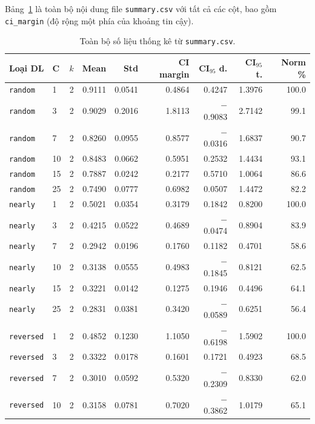 \documentclass[12pt, a4paper]{article}
\begin{document}
Bảng~\ref{tab:full} là toàn bộ nội dung file \texttt{summary.csv} với tất cả các
cột, bao gồm \texttt{ci\_margin} (độ rộng một phía của khoảng tin cậy).

\begin{table}[H]
\centering
\caption{Toàn bộ số liệu thống kê từ \texttt{summary.csv}.}
\label{tab:full}
\scriptsize
\renewcommand{\arraystretch}{1.2}
\begin{tabular}{llrrrrrrr}
\toprule
\textbf{Loại DL} & \textbf{C} & \textbf{$k$} & \textbf{Mean} & \textbf{Std}
                 & \textbf{CI margin} & \textbf{CI$_{95}$ d.} & \textbf{CI$_{95}$ t.} & \textbf{Norm \%} \\
\midrule
\texttt{random}   & 1  & 2 & 0.9111 & 0.0541 & 0.4864 &  0.4247 & 1.3976 & 100.0 \\
\texttt{random}   & 3  & 2 & 0.9029 & 0.2016 & 1.8113 & $-$0.9083 & 2.7142 & 99.1 \\
\texttt{random}   & 7  & 2 & 0.8260 & 0.0955 & 0.8577 & $-$0.0316 & 1.6837 & 90.7 \\
\texttt{random}   & 10 & 2 & 0.8483 & 0.0662 & 0.5951 &  0.2532 & 1.4434 & 93.1 \\
\texttt{random}   & 15 & 2 & 0.7887 & 0.0242 & 0.2177 &  0.5710 & 1.0064 & 86.6 \\
\texttt{random}   & 25 & 2 & 0.7490 & 0.0777 & 0.6982 &  0.0507 & 1.4472 & 82.2 \\
\midrule
\texttt{nearly}   & 1  & 2 & 0.5021 & 0.0354 & 0.3179 &  0.1842 & 0.8200 & 100.0 \\
\texttt{nearly}   & 3  & 2 & 0.4215 & 0.0522 & 0.4689 & $-$0.0474 & 0.8904 & 83.9 \\
\texttt{nearly}   & 7  & 2 & 0.2942 & 0.0196 & 0.1760 &  0.1182 & 0.4701 & 58.6 \\
\texttt{nearly}   & 10 & 2 & 0.3138 & 0.0555 & 0.4983 & $-$0.1845 & 0.8121 & 62.5 \\
\texttt{nearly}   & 15 & 2 & 0.3221 & 0.0142 & 0.1275 &  0.1946 & 0.4496 & 64.1 \\
\texttt{nearly}   & 25 & 2 & 0.2831 & 0.0381 & 0.3420 & $-$0.0589 & 0.6251 & 56.4 \\
\midrule
\texttt{reversed} & 1  & 2 & 0.4852 & 0.1230 & 1.1050 & $-$0.6198 & 1.5902 & 100.0 \\
\texttt{reversed} & 3  & 2 & 0.3322 & 0.0178 & 0.1601 &  0.1721 & 0.4923 & 68.5 \\
\texttt{reversed} & 7  & 2 & 0.3010 & 0.0592 & 0.5320 & $-$0.2309 & 0.8330 & 62.0 \\
\texttt{reversed} & 10 & 2 & 0.3158 & 0.0781 & 0.7020 & $-$0.3862 & 1.0179 & 65.1 \\

\end{tabular}
\end{table}
\end{document}
